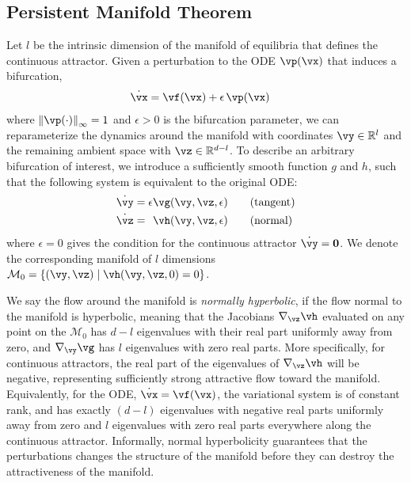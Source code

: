 \documentclass{article} %
\newcounter{ct}
\newcommand{\reals}{\mathbb{R}}
\newcommand{\manifold}{\mathcal{M}}
\newcommand{\uniformNorm}[1]{\left\|#1\right\|_\infty} %
\theoremstyle{definition}
\theoremstyle{remark}
\begin{document}
\subsection{Persistent Manifold Theorem}\label{sec:imt}
Let $l$ be the intrinsic dimension of the manifold of equilibria that defines the continuous attractor.
Given a perturbation to the ODE $\vp(\vx)$ that induces a bifurcation,
\begin{align}\label{eq:perturbation:nonparam}
	\dot{\vx} &= \vf(\vx) + \epsilon\,\vp(\vx)
\end{align}
where $\uniformNorm{\vp(\cdot)} = 1$ and $\epsilon > 0$ is the bifurcation parameter,
we can reparameterize the dynamics around the manifold with coordinates $\vy \in \reals^l$ and the remaining ambient space with $\vz \in \reals^{d-l}$.
To describe an arbitrary bifurcation of interest, we introduce a sufficiently smooth function $g$ and $h$, such that the following system is equivalent to the original ODE:
\begin{align}\label{eq:fenichel:flow}
    \dot{\vy} &=           \epsilon  \vg(\vy, \vz, \epsilon) \qquad \text{(tangent)}\\
    \dot{\vz} &= \hphantom{\epsilon} \vh(\vy, \vz, \epsilon) \qquad \text{(normal)}
\end{align}
where $\epsilon = 0$ gives the condition for the continuous attractor $\dot{\vy} = \mathbf{0}$.
We denote the corresponding manifold of $l$ dimensions $\manifold_0 = \{(\vy,\vz) \mid \vh(\vy,\vz,0) = 0\}$.

We say the flow around the manifold is \emph{normally hyperbolic}, if the flow normal to the manifold is hyperbolic, meaning that the Jacobians $\nabla_\vz \vh$ evaluated on any point on the $\manifold_0$ has $d-l$ eigenvalues with their real part uniformly away from zero, and $\nabla_\vy \vg$ has $l$ eigenvalues with zero real parts.
More specifically, for continuous attractors, the real part of the eigenvalues of $\nabla_\vz \vh$ will be negative, representing sufficiently strong attractive flow toward the manifold.
Equivalently, for the ODE, $\dot{\vx} = \vf(\vx)$, the variational system is of constant rank, and has exactly $(d-l)$ eigenvalues with negative real parts uniformly away from zero and $l$ eigenvalues with zero real parts everywhere along the continuous attractor.
Informally, normal hyperbolicity guarantees that the perturbations changes the structure of the manifold before they can destroy the attractiveness of the manifold.
\end{document}
